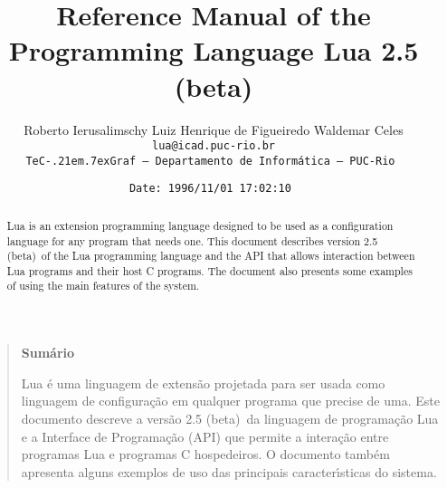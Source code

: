 

\newcommand{\rw}[1]{{\bf #1}}
\newcommand{\see}[1]{see Section~\ref{#1}}
\newcommand{\nil}{{\bf nil}}
\newcommand{\Line}{\rule{\linewidth}{.5mm}}
\def\tecgraf{{\sf TeC\kern-.21em\lower.7ex\hbox{Graf}}}

\newcommand{\Index}[1]{#1\index{#1}}
\newcommand{\IndexVerb}[1]{{\tt #1}\index{#1}}
\newcommand{\Def}[1]{{\em #1}\index{#1}}
\newcommand{\Deffunc}[1]{\index{#1}}

\newcommand{\ff}{$\bullet$\ }

\newcommand{\Version}{2.5 (beta)}

\makeindex



\title{Reference Manual of the Programming Language Lua \Version}

\author{%
Roberto Ierusalimschy\quad
Luiz Henrique de Figueiredo\quad
Waldemar Celes
\vspace{1.0ex}\\
\smallskip
\small\tt lua@icad.puc-rio.br
\vspace{2.0ex}\\
\tecgraf\ --- Departamento de Inform\'atica --- PUC-Rio
}

\date{\small \verb$Date: 1996/11/01 17:02:10 $}

\maketitle

\begin{abstract}
\noindent
Lua is an extension programming language designed to be used
as a configuration language for any program that needs one.
This document describes version \Version\ of the Lua programming language and
the API that allows interaction between Lua programs and their host C programs.
The document also presents some examples of using the main
features of the system.
\end{abstract}

\vspace{4ex}
\begin{quotation}
\small
\begin{center}{\bf Sum\'ario}\end{center}
\vspace{1ex}
\noindent
Lua \'e uma linguagem de extens\~ao projetada para ser usada como
linguagem de configura\c{c}\~ao em qualquer programa que precise de
uma.
Este documento descreve a vers\~ao \Version\ da linguagem de
programa\c{c}\~ao Lua e a Interface de Programa\c{c}\~ao (API) que permite
a intera\c{c}\~ao entre programas Lua e programas C hospedeiros.
O documento tamb\'em apresenta alguns exemplos de uso das principais
ca\-racte\-r\'{\i}sticas do sistema.
\end{quotation}


